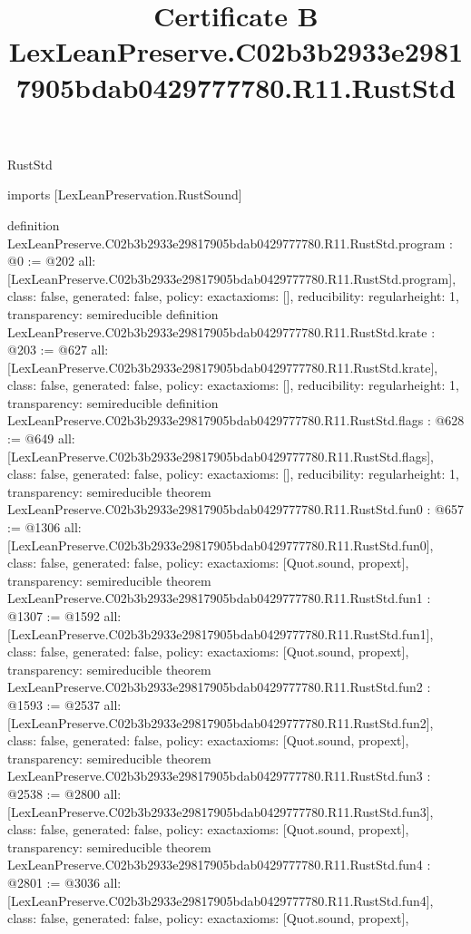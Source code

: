 \begin{lexlean}{RustStd}
\title{Certificate B LexLeanPreserve.C02b3b2933e29817905bdab0429777780.R11.RustStd}
\begin{coremodule}
imports [LexLeanPreservation.RustSound]

definition LexLeanPreserve.C02b3b2933e29817905bdab0429777780.R11.RustStd.program : @0 := @202 {
  all: [LexLeanPreserve.C02b3b2933e29817905bdab0429777780.R11.RustStd.program],
  class: false,
  generated: false,
  policy: exact{axioms: []},
  reducibility: regular{height: 1},
  transparency: semireducible
}
definition LexLeanPreserve.C02b3b2933e29817905bdab0429777780.R11.RustStd.krate : @203 := @627 {
  all: [LexLeanPreserve.C02b3b2933e29817905bdab0429777780.R11.RustStd.krate],
  class: false,
  generated: false,
  policy: exact{axioms: []},
  reducibility: regular{height: 1},
  transparency: semireducible
}
definition LexLeanPreserve.C02b3b2933e29817905bdab0429777780.R11.RustStd.flags : @628 := @649 {
  all: [LexLeanPreserve.C02b3b2933e29817905bdab0429777780.R11.RustStd.flags],
  class: false,
  generated: false,
  policy: exact{axioms: []},
  reducibility: regular{height: 1},
  transparency: semireducible
}
theorem LexLeanPreserve.C02b3b2933e29817905bdab0429777780.R11.RustStd.fun0 : @657 := @1306 {
  all: [LexLeanPreserve.C02b3b2933e29817905bdab0429777780.R11.RustStd.fun0],
  class: false,
  generated: false,
  policy: exact{axioms: [Quot.sound, propext]},
  transparency: semireducible
}
theorem LexLeanPreserve.C02b3b2933e29817905bdab0429777780.R11.RustStd.fun1 : @1307 := @1592 {
  all: [LexLeanPreserve.C02b3b2933e29817905bdab0429777780.R11.RustStd.fun1],
  class: false,
  generated: false,
  policy: exact{axioms: [Quot.sound, propext]},
  transparency: semireducible
}
theorem LexLeanPreserve.C02b3b2933e29817905bdab0429777780.R11.RustStd.fun2 : @1593 := @2537 {
  all: [LexLeanPreserve.C02b3b2933e29817905bdab0429777780.R11.RustStd.fun2],
  class: false,
  generated: false,
  policy: exact{axioms: [Quot.sound, propext]},
  transparency: semireducible
}
theorem LexLeanPreserve.C02b3b2933e29817905bdab0429777780.R11.RustStd.fun3 : @2538 := @2800 {
  all: [LexLeanPreserve.C02b3b2933e29817905bdab0429777780.R11.RustStd.fun3],
  class: false,
  generated: false,
  policy: exact{axioms: [Quot.sound, propext]},
  transparency: semireducible
}
theorem LexLeanPreserve.C02b3b2933e29817905bdab0429777780.R11.RustStd.fun4 : @2801 := @3036 {
  all: [LexLeanPreserve.C02b3b2933e29817905bdab0429777780.R11.RustStd.fun4],
  class: false,
  generated: false,
  policy: exact{axioms: [Quot.sound, propext]},
}
\end{coremodule}
\end{lexlean}
